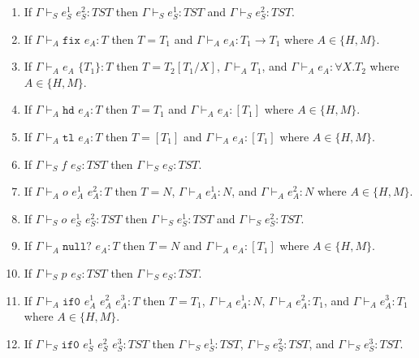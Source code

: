 \begin{lemma}
\begin{enumerate}
\item If $\Gamma\vdash_{S}e_{S}^{1}$ $e_{S}^{2}:TST$ then $\Gamma\vdash_{S}e_{S}^{1}:TST$ and $\Gamma\vdash_{S}e_{S}^{2}:TST$.

\item If $\Gamma\vdash_{A}\mathtt{fix}$ $e_{A}:T$ then $T=T_{1}$ and $\Gamma\vdash_{A}e_{A}:T_{1}\rightarrow T_{1}$ where $A\in\lbrace H,M\rbrace$.

\item If $\Gamma\vdash_{A}e_{A}$ $\lbrace T_{1}\rbrace:T$ then $T=T_{2}[T_{1}/X]$, $\Gamma\vdash_{A}T_{1}$, and $\Gamma\vdash_{A}e_{A}:\forall X.T_{2}$ where $A\in\lbrace H,M\rbrace$.

\item If $\Gamma\vdash_{A}\mathtt{hd}$ $e_{A}:T$ then $T=T_{1}$ and $\Gamma\vdash_{A}e_{A}:[T_{1}]$ where $A\in\lbrace H,M\rbrace$.

\item If $\Gamma\vdash_{A}\mathtt{tl}$ $e_{A}:T$ then $T=[T_{1}]$ and $\Gamma\vdash_{A}e_{A}:[T_{1}]$ where $A\in\lbrace H,M\rbrace$.

\item If $\Gamma\vdash_{S}f$ $e_{S}:TST$ then $\Gamma\vdash_{S}e_{S}:TST$.

\item If $\Gamma\vdash_{A}o$ $e_{A}^{1}$ $e_{A}^{2}:T$ then $T=N$, $\Gamma\vdash_{A}e_{A}^{1}:N$, and $\Gamma\vdash_{A}e_{A}^{2}:N$ where $A\in\lbrace H,M\rbrace$.

\item If $\Gamma\vdash_{S}o$ $e_{S}^{1}$ $e_{S}^{2}:TST$ then $\Gamma\vdash_{S}e_{S}^{1}:TST$ and $\Gamma\vdash_{S}e_{S}^{2}:TST$.

\item If $\Gamma\vdash_{A}\mathtt{null?}$ $e_{A}:T$ then $T=N$ and $\Gamma\vdash_{A}e_{A}:[T_{1}]$ where $A\in\lbrace H,M\rbrace$.

\item If $\Gamma\vdash_{S}p$ $e_{S}:TST$ then $\Gamma\vdash_{S}e_{S}:TST$.

\item If $\Gamma\vdash_{A}\mathtt{if0}$ $e_{A}^{1}$ $e_{A}^{2}$ $e_{A}^{3}:T$ then $T=T_{1}$, $\Gamma\vdash_{A}e_{A}^{1}:N$, $\Gamma\vdash_{A}e_{A}^{2}:T_{1}$, and $\Gamma\vdash_{A}e_{A}^{3}:T_{1}$ where $A\in\lbrace H,M\rbrace$.

\item If $\Gamma\vdash_{S}\mathtt{if0}$ $e_{S}^{1}$ $e_{S}^{2}$ $e_{S}^{3}:TST$ then $\Gamma\vdash_{S}e_{S}^{1}:TST$, $\Gamma\vdash_{S}e_{S}^{2}:TST$, and $\Gamma\vdash_{S}e_{S}^{3}:TST$.


\end{enumerate}
\end{lemma}

